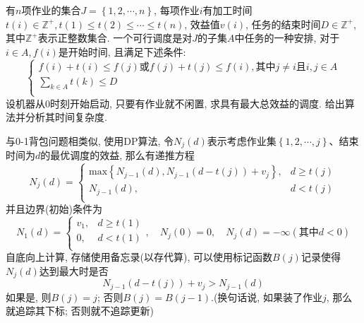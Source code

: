 \documentclass{article}
\begin{document}
\pagebreak

\begin{homeworkProblem}
	有$n$项作业的集合$J=\left\{ 1,2,\cdots,n \right\}$, 每项作业$i$有加工时间$t(i)\in \mathbb{Z}^{+},t(1)\leq t(2)\leq \cdots \leq t(n)$, 效益值$v(i)$, 任务的结束时间$D\in \mathbb{Z}^{+}$, 其中$\mathbb{Z}^{+}$表示正整数集合. 一个可行调度是对$J$的子集$A$中任务的一种安排, 对于$i\in A,f(i)$是开始时间, 且满足下述条件:
	$$
	\begin{cases}
		f\left( i \right) +t\left( i \right) \le f\left( j \right) \text{或}f\left( j \right) +t\left( j \right) \le f\left( i \right) ,\text{其中}j\ne i\text{且}i,j\in A\\
		\displaystyle \sum_{k\in A}{t\left( k \right)}\le D\\
	\end{cases}
	$$
	设机器从0时刻开始启动, 只要有作业就不闲置, 求具有最大总效益的调度. 给出算法并分析其时间复杂度.

	\solution 与0-1背包问题相类似, 使用DP算法, 令$N_j(d)$表示考虑作业集$\left\{ 1,2,\cdots,j \right\}$、结束时间为$d$的最优调度的效益, 那么有递推方程
	$$
	N_j\left( d \right) =\begin{cases}
		\text{max} \left\{ N_{j-1}\left( d \right) ,N_{j-1}\left( d-t\left( j \right) \right) +v_j \right\} ,&		d\ge t\left( j \right)\\
		N_{j-1}\left( d \right) ,&		d<t\left( j \right)\\
	\end{cases}
	$$
	并且边界(初始)条件为
	$$
	N_1\left( d \right) =\begin{cases}
		v_1,&		d\ge t\left( 1 \right)\\
		0,&		d<t\left( 1 \right)\\
	\end{cases},\quad N_j\left( 0 \right) =0,\quad N_j\left( d \right) =-\infty \left( \text{其中}d<0 \right) 	
	$$
	自底向上计算, 存储使用备忘录(以存代算), 可以使用标记函数$B(j)$记录使得$N_j(d)$达到最大时是否
	$$
	N_{j-1}\left( d-t\left( j \right) \right) +v_j>N_{j-1}\left( d \right)
	$$
	如果是, 则$B(j)=j$; 否则$B(j)=B(j-1)$.(换句话说, 如果装了作业$j$, 那么就追踪其下标; 否则就不追踪更新)
	

\end{homeworkProblem}
\end{document}
